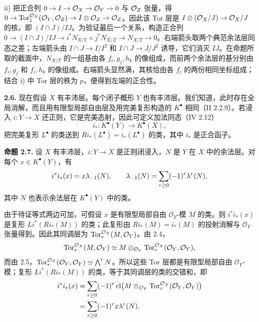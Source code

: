 ii) 把正合列 \(0\to I\to\mathcal O_X\to\mathcal O_Y\to0\) 与 \(\mathcal O_Z\) 张量，得 \(0\to\operatorname{Tor}_1^{\mathcal O_X}(\mathcal O_Y,\mathcal O_Z)\to I\otimes\mathcal O_Z\to\mathcal O_Z\)。因此该 Tor 层是 \(I\otimes(\mathcal O_X/J)\to\mathcal O_X/J\) 的核，即 \((I\cap J)/IJ\)。为验证最后一个关系，构造正合列 \(0\to(I\cap J)/IJ\to i^*N_{X/Y}\times j^*N_{X/Z}\to N_{X/T}\to0\)。右端箭头取两个典范余法层同态之差；左端箭头由 \(I\cap J\to I/I^2\) 和 \(I\cap J\to J/J^2\) 诱导，它们消灭 \(IJ\)。在命题所取的截面中，\(N_{X/T}\) 的一组基由各 \(f_i,g_j,h_k\) 的像组成，而前两个余法层的基分别由 \(f_i,g_j\) 和 \(f_i,h_k\) 的像组成。右端箭头显然满，其核恰由各 \(f_i\) 的两份相同坐标组成；结合 i) 中 Tor 层的秩为 \(p\)，便得到左端的正合性。

\textbf{2.6.} 现在假设 \(X\) 有丰沛层。每个闭子概形 \(Y\) 也有丰沛层。我们知道，此时存在全局消解，而且用有限型局部自由层及用完美复形构造的 \(K^\bullet\) 相同（II 2.2.9）。若浸入 \(i:Y\to X\) 还正则，它是完美态射，因此可定义加法同态（IV 2.12）
\[
 i_*:K^\bullet(Y)\longrightarrow K^\bullet(X),
\]
把完美复形 \(L^\bullet\) 的类送到 \(Ri_*(L^\bullet)=i_*(L^\bullet)\) 的类，其中 \(i_*\) 是正合函子。

\textbf{命题 2.7.} 设 \(X\) 有丰沛层，\(i:Y\to X\) 是正则闭浸入，\(N\) 是 \(Y\) 在 \(X\) 中的余法层。对每个 \(x\in K^\bullet(Y)\)，有
\begin{equation}
 i^*i_*(x)=x\lambda_{-1}(N),\qquad
 \lambda_{-1}(N)=\sum_{r\geq0}(-1)^r\lambda^r(N),\notag
\end{equation}
其中 \(N\) 也表示余法层在 \(K^\bullet(Y)\) 中的类。

由于待证等式两边可加，可假设 \(x\) 是有限型局部自由 \(\mathcal O_Y\)-模 \(M\) 的类。则 \(i^*i_*(x)\) 是复形 \(Li^*(Ri_*(M))\) 的类；此复形由 \(Ri_*(M)=i_*(M)\) 的投射消解与 \(\mathcal O_Y\) 张量得到。因此其同调层为 \(\operatorname{Tor}_r^{\mathcal O_X}(M,\mathcal O_Y)\)。由 2.4，
\[
 \operatorname{Tor}_r^{\mathcal O_X}(M,\mathcal O_Y)
 \simeq M\otimes_{\mathcal O_Y}\operatorname{Tor}_r^{\mathcal O_X}(\mathcal O_Y,\mathcal O_Y),
\]
而由 2.5，\(\operatorname{Tor}_r^{\mathcal O_X}(\mathcal O_Y,\mathcal O_Y)\simeq\bigwedge^rN\)。所以这些 Tor 层都是有限型局部自由 \(\mathcal O_Y\)-模；复形 \(Li^*(Ri_*(M))\) 的类，等于其同调层的类的交错和，即
\[
\begin{aligned}
 i^*i_*(x)
 &=\sum_{r\geq0}(-1)^r\operatorname{cl}\bigl(M\otimes_{\mathcal O_Y}
                 \operatorname{Tor}_r^{\mathcal O_X}(\mathcal O_Y,\mathcal O_Y)\bigr)\\
 &=\sum_{r\geq0}(-1)^rx\lambda^r(N).
\end{aligned}
\]

